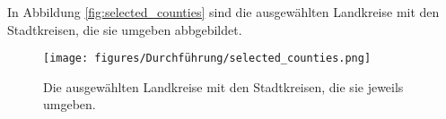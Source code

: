 In Abbildung \autoref{fig:selected_counties} sind die ausgewählten Landkreise mit den Stadtkreisen, die sie umgeben abbgebildet.
\begin{figure}
    \centering
    \texttt{[image: figures/Durchführung/selected\_counties.png]}
    \caption{Die ausgewählten Landkreise mit den Stadtkreisen, die sie jeweils umgeben.}
    \label{fig:selected_counties}
\end{figure}